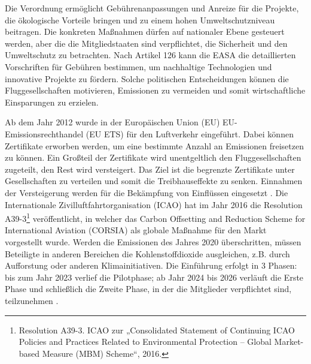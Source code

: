 Die Verordnung ermöglicht Gebührenanpassungen und Anreize für die Projekte, 
die ökologische Vorteile bringen und zu einem hohen Umweltschutzniveau beitragen.
%
Die konkreten Maßnahmen dürfen auf nationaler Ebene gesteuert werden, 
aber die die Mitgliedstaaten sind verpflichtet, die Sicherheit und den Umweltschutz zu betrachten. 
Nach Artikel 126 kann die EASA die detaillierten 
Vorschriften für Gebühren bestimmen, um nachhaltige Technologien und innovative Projekte zu fördern.
%
%
Solche politischen Entscheidungen können die Fluggesellschaften motivieren, 
Emissionen zu vermeiden und somit wirtschaftliche Einsparungen zu erzielen.

Ab dem Jahr 2012 wurde in der Europäischen Union (EU) EU-Emissionsrechthandel (EU ETS) für den Luftverkehr eingeführt.
Dabei können Zertifikate erworben werden, um eine bestimmte Anzahl an Emissionen freisetzen zu können.
Ein Großteil der Zertifikate wird unentgeltlich den Fluggesellschaften zugeteilt, den Rest wird versteigert. 
Das Ziel ist die begrenzte Zertifikate unter Gesellschaften zu verteilen und somit die Treibhauseffekte zu senken.
Einnahmen der Versteigerung werden für die Bekämpfung von Einflüssen eingesetzt \cite{conrady2019luftverkehr}.
Die Internationale Zivilluftfahrtorganisation (ICAO) hat im Jahr 2016 die Resolution A39-3\footnote{Resolution A39-3. ICAO zur „Consolidated Statement of Continuing ICAO Policies and Practices Related to Environmental Protection – Global Market-based Measure (MBM) Scheme“, 2016.} veröffentlicht, 
in welcher das Carbon Offsetting and Reduction Scheme for International Aviation (CORSIA) 
als globale Maßnahme für den Markt vorgestellt wurde. 
Werden die Emissionen des Jahres 2020 überschritten, müssen Beteiligte in anderen Bereichen 
die Kohlenstoffdioxide ausgleichen, z.B. durch Aufforstung oder anderen Klimainitiativen. 
Die Einführung erfolgt in 3 Phasen: 
bis zum Jahr 2023 verlief die Pilotphase; ab Jahr 2024 bis 2026 verläuft die Erste Phase und schließlich die Zweite Phase, 
in der die Mitglieder verpflichtet sind, teilzunehmen \cite{conrady2019luftverkehr}. 


